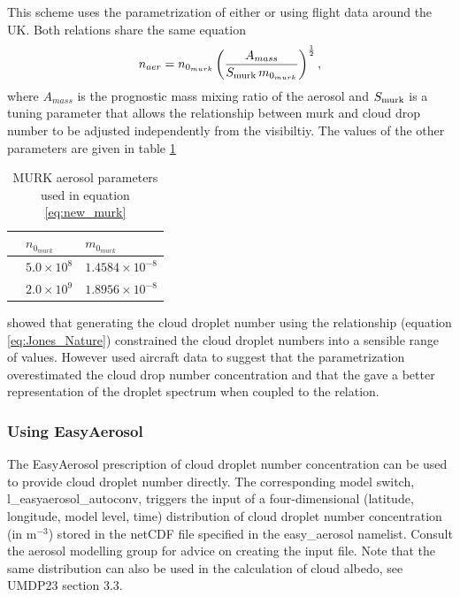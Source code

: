 \documentclass{UMDP_article}
\def\bq{\begin{equation}}
\def\eq{\end{equation}}
\begin{document}
This scheme uses the parametrization of either \cite{Clark:etal:2008} or 
\cite{Haywood:etal:2008} using flight data around the UK. Both relations share
the same equation
\bq
\label{eq:new_murk}
n_{aer}= n_{0_{murk}} \left( \frac{A_{mass}}
{S_{\rm murk} \, m_{0_{murk}} } \right)^{\frac{1}{2}},
\eq 
where $A_{mass}$ is the prognostic mass mixing ratio of the aerosol and $S_{\rm murk}$ 
is a tuning parameter that allows the relationship between murk and cloud drop number 
to be adjusted independently from the visibiltiy. The values of the other parameters 
are given in table \ref{tab:haycla}
%
\begin{table}[ht!]
\begin{center}
\begin{tabular}{lll}
\hline
                         & $n_{0_{murk}}$            & $m_{0_{murk}}$            \\  \hline
\cite{Clark:etal:2008}   &  $5.0 \times 10^8$   & $1.4584 \times 10^{-8}$  \\  
\cite{Haywood:etal:2008} &  $2.0 \times 10^9$   & $1.8956 \times 10^{-8}$ 
\\ \hline
\end{tabular}
\end{center}
\caption{MURK aerosol parameters used in equation \ref{eq:new_murk}}
\label{tab:haycla}
\end{table}
%

\cite{Wilkinson:etal:2010:ams} showed that generating the cloud droplet number
using the \cite{Jones:etal:1994} relationship (equation \ref{eq:Jones_Nature})
constrained the cloud droplet numbers into a sensible range of values. However 
\cite{Abel:2012} used aircraft data to suggest that the 
\cite{Haywood:etal:2008} parametrization overestimated the cloud drop number
concentration and that the \cite{Clark:etal:2008} gave a better representation
of the droplet spectrum when coupled to the \cite{Jones:etal:1994} relation.

\subsubsection{Using EasyAerosol}
\label{sec:easy_cdnc}
The EasyAerosol prescription of cloud droplet number concentration can be used to provide
cloud droplet number directly.
The corresponding model switch, l\_easyaerosol\_autoconv, triggers the input of a four-dimensional
(latitude, longitude, model level, time) distribution of cloud droplet number concentration (in m$^{-3}$)
stored in the netCDF file specified in the easy\_aerosol namelist.
Consult the aerosol modelling group for advice on creating the input file.
Note that the same distribution can also be used in the calculation of cloud albedo, see UMDP23 section 3.3. 
\end{document}
